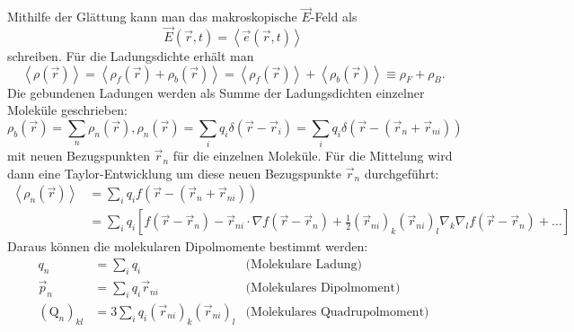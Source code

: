 Mithilfe der Glättung kann man das makroskopische $\vec {E}$-Feld als
\begin{equation*}
	\vec {E}\left(\vec {r},t\right)=\left\langle \vec {e}\left(\vec {r},t\right)\right\rangle
\end{equation*}
schreiben. Für die Ladungsdichte erhält man
\begin{equation*}
	\left\langle \rho \left(\vec {r}\right)\right\rangle =\left\langle \rho _{f}\left(\vec {r}\right)+\rho _{b}\left(\vec {r}\right)\right\rangle =\left\langle \rho _{f}\left(\vec {r}\right)\right\rangle +\left\langle \rho _{b}\left(\vec {r}\right)\right\rangle \equiv \rho _{F}+\rho _{B}.
\end{equation*}
Die gebundenen Ladungen werden als Summe der Ladungsdichten einzelner Moleküle geschrieben:
\begin{equation*}
	\rho _{b}\left(\vec {r}\right)=\sum _{n}\rho _{n}\left(\vec {r}\right), \rho _{n}\left(\vec {r}\right)=\sum _{i}q_{i}\delta \left(\vec {r}-\vec {r}_{i}\right)=\sum _{i}q_{i}\delta \left(\vec {r}-\left(\vec {r}_{n}+\vec {r}_{ni}\right)\right)
\end{equation*}
mit neuen Bezugspunkten $\vec {r}_{n}$ für die einzelnen Moleküle. Für die Mittelung wird dann eine Taylor-Entwicklung um diese neuen Bezugspunkte $\vec {r}_{n}$ durchgeführt:
\begin{align*}
	\left\langle \rho _{n}\left(\vec {r}\right)\right\rangle & =\sum _{i}q_{i}f\left(\vec {r}-\left(\vec {r}_{n}+\vec {r}_{ni}\right)\right) \\&=\sum _{i}q_{i}\left[f\left(\vec {r}-\vec {r}_{n}\right)-\vec {r}_{ni}\cdot \nabla f\left(\vec {r}-\vec {r}_{n}\right)+\frac{1}{2}\left(\vec {r}_{ni}\right)_{k}\left(\vec {r}_{ni}\right)_{l}\nabla _{k}\nabla _{l}f\left(\vec {r}-\vec {r}_{n}\right)+\ldots \right]
\end{align*}
Daraus können die molekularen Dipolmomente bestimmt werden:
\begin{align*}
	q_{n}                            & =\sum _{i}q_{i}                                                              & \text{(Molekulare Ladung)}           \\
	\vec {p}_{n}                     & =\sum _{i}q_{i}\vec {r}_{ni}                                                 & \text{(Molekulares Dipolmoment)}     \\
	\left(\mathrm{Q}_{n}\right)_{kl} & =3\sum _{i}q_{i}\left(\vec {r}_{ni}\right)_{k}\left(\vec {r}_{ni}\right)_{l} & \text{(Molekulares Quadrupolmoment)}
\end{align*}
